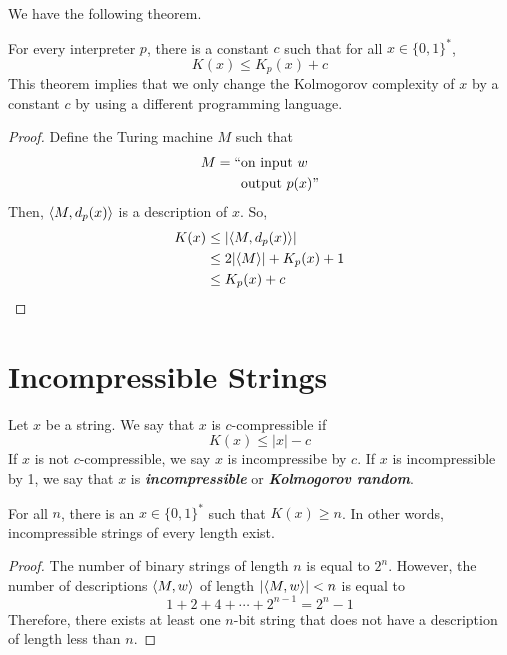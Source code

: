 We have the following theorem.
\begin{theorem}
    For every interpreter $p$, there is a constant $c$ such that for all $x \in \{0,1\}^*$,
    $$
    K(x) \leq K_p(x) + c
    $$
    This theorem implies that we only change the Kolmogorov complexity of $x$ by a constant $c$ by using a different programming language.
\end{theorem}

\begin{proof}
    Define the Turing machine $M$ such that
    $$
    \begin{aligned}
        M = ``&\text{on input $w$} \\
        &\text{output $p(x)$}"
    \end{aligned}
    $$
    Then, $\langle M,d_p(x) \rangle$ is a description of $x$. So,
    $$
    \begin{aligned}
        K(x) &\leq |\langle M,d_p(x) \rangle| \\
        &\leq 2|\langle M \rangle| + K_p(x) + 1 \\
        &\leq K_p(x) + c
    \end{aligned}
    $$
\end{proof}

\section{Incompressible Strings}

\vspace{\parskip}

\begin{definition}
    Let $x$ be a string. We say that $x$ is $c$-compressible if
    $$
    K(x) \leq |x| - c
    $$
    If $x$ is not $c$-compressible, we say $x$ is incompressibe by $c$. If $x$ is incompressible by 1, we say that $x$ is \textit{\textbf{incompressible}} or \textit{\textbf{Kolmogorov random}}.
\end{definition}

\begin{theorem}
    For all $n$, there is an $x \in \{0,1\}^*$ such that $K(x) \geq n$. In other words, incompressible strings of every length exist.
\end{theorem}

\begin{proof}
    The number of binary strings of length $n$ is equal to $2^n$. However, the number of descriptions $\langle M,w \rangle$ of length $|\langle M,w \rangle| < n$ is equal to
    $$
    1 + 2 + 4 + \cdots + 2^{n-1} = 2^n - 1
    $$
    Therefore, there exists at least one $n$-bit string that does not have a description of length less than $n$.
\end{proof}

